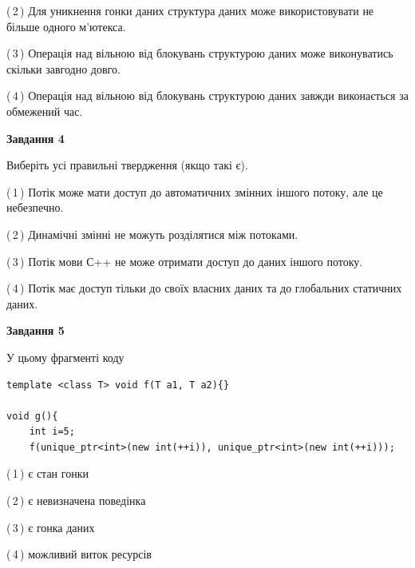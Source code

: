 \documentclass[12pt, ukrainian]{article}
\begin{document}
\begin {large}
{(\,2\,) Для уникнення гонки даних структура даних може використовувати не більше одного м’ютекса.%

(\,3\,) Операція над вільною від блокувань структурою даних може виконуватись скільки завгодно довго.%

(\,4\,) Операція над вільною від блокувань структурою даних завжди виконається за обмежений час.%



\begin{center}
\textbf{Завдання 4}
\end{center}
Виберіть усі правильні твердження (якщо такі є).\par
\vspace{2mm}

(\,1\,) Потік може мати доступ до автоматичних змінних іншого потоку, але це небезпечно.%

(\,2\,) Динамічні змінні не можуть розділятися між потоками.%

(\,3\,) Потік мови С++ не може отримати доступ до даних іншого потоку.%

(\,4\,) Потік має доступ тільки до своїх власних даних та до глобальних статичних даних.%



\begin{center}
\textbf{Завдання 5}
\end{center}
У цьому фрагменті коду
\begin{verbatim}
template <class T> void f(T a1, T a2){}

void g(){
    int i=5;
    f(unique_ptr<int>(new int(++i)), unique_ptr<int>(new int(++i)));
\end{verbatim}

(\,1\,) є стан гонки%

(\,2\,) є невизначена поведінка%

(\,3\,) є гонка даних%

(\,4\,) можливий виток ресурсів%


}
\end {large}
\end{document}
